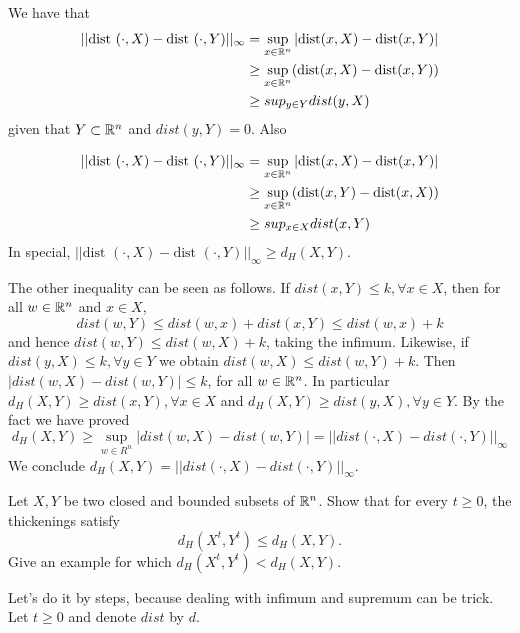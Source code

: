 We have that 
\begin{equation*}
    \begin{split}
        ||\text{dist }(\cdot, X) - \text{dist }(\cdot, Y)||_{\infty} &= \sup_{x \in \mathbb{R}^n} |\text{dist}(x, X) - \text{dist}(x, Y)| \\
        &\ge \sup_{x \in \mathbb{R}^n} (\text{dist}(x, X) - \text{dist}(x, Y)) \\
        &\ge sup_{y \in Y} dist(y,X)
    \end{split}
\end{equation*}
given that $Y \subset \mathbb{R}^n$ and $dist(y,Y) = 0$. Also

\begin{equation*}
    \begin{split}
        ||\text{dist }(\cdot, X) - \text{dist }(\cdot, Y)||_{\infty} &= \sup_{x \in \mathbb{R}^n} |\text{dist}(x, X) - \text{dist}(x, Y)| \\
        &\ge \sup_{x \in \mathbb{R}^n} (\text{dist}(x, Y) - \text{dist}(x, X)) \\
        &\ge sup_{x \in X} dist(x,Y)
    \end{split}
\end{equation*}
In special, $||\text{dist }(\cdot, X) - \text{dist }(\cdot, Y)||_{\infty} \ge
d_H(X,Y)$. 

The other inequality can be seen as follows. If $dist(x,Y) \le k, \forall x \in X$, then for all $w \in \mathbb{R}^n$ and $x \in
X$, $$dist(w,Y) \le dist(w,x) + dist(x,Y) \le dist(w,x) + k$$ and hence
$dist(w,Y) \le dist(w,X) + k$, taking the infimum. Likewise, if $dist(y,X) \le
k, \forall y \in Y$ we obtain $dist(w, X) \le dist(w,Y) + k$. Then 
$|dist(w,X) - dist(w,Y)| \le k$, for all $w \in \mathbb{R}^n$.
In particular $d_H(X,Y) \ge dist(x,Y), \forall x \in X$ and $d_H(X,Y) \ge
dist(y,X), \forall y \in Y$. By the fact we have proved 
$$
d_H(X,Y) \ge \sup_{w \in R^n}|dist(w,X) - dist(w,Y)| = ||dist(\cdot, X) - dist(\cdot, Y)||_{\infty}
$$
We conclude $d_H(X,Y) = ||dist(\cdot, X) - dist(\cdot, Y)||_{\infty}$. 

\noindent\linia

\begin{exercise}
    Let $X, Y$ be two closed and bounded subsets of $\mathbb{R}^n$. Show that for
    every $t \ge 0$, the thickenings satisfy 
    $$
    d_H(X^t, Y^t) \le d_H(X, Y).
    $$ 
    Give an example for which $d_H(X^t, Y^t) < d_H(X, Y)$.
\end{exercise}

Let's do it by steps, because dealing with infimum and supremum can be trick.
Let $t \ge 0$ and denote $dist$ by $d$. 

